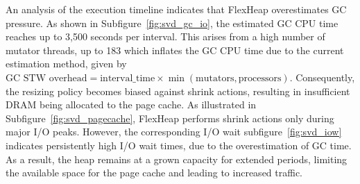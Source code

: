 An analysis of the execution timeline indicates that FlexHeap overestimates GC pressure.
As shown in Subfigure~\ref{fig:svd_gc_io}, the estimated GC CPU time reaches up to 3{,}500 seconds
per interval. This arises from a high number of mutator threads, up to 183 which inflates 
the GC CPU time due to the current estimation method, given by \( \text{GC STW overhead} = \text{interval\_time} \times \min(\text{mutators}, \text{processors}) \).
Consequently, the resizing policy becomes 
biased against shrink actions, resulting in insufficient DRAM being allocated to the page cache. 
As illustrated in Subfigure~\ref{fig:svd_pagecache}, FlexHeap performs shrink actions only during major I/O peaks. 
However, the corresponding I/O wait subfigure~\ref{fig:svd_iow} indicates persistently high I/O wait times, due to  
the overestimation of GC time. As a result, the heap 
remains at a grown capacity for extended periods, limiting the available space for the page cache and leading to 
increased traffic.

